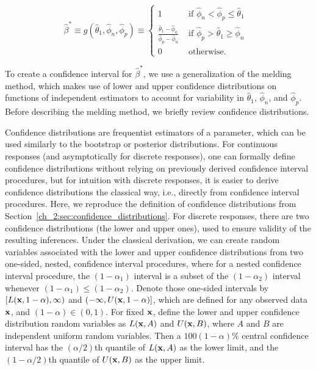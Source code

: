 \begin{equation}
\hat{\beta}^* \equiv
g(\hat{\theta}_1, \hat{\phi}_n, \hat{\phi}_p)
\equiv
\left\{
\begin{array}{ll}
1 & \mbox{ if $\hat{\phi}_n < \hat{\phi}_p \leq \hat{\theta}_1$ }  \\
\frac{\hat{\theta}_1 - \hat{\phi}_n}{\hat{\phi}_p - \hat{\phi}_n} &
\mbox{ if $\hat{\phi}_p > \hat{\theta}_1 \geq \hat{\phi}_n$ } \\
0 & \mbox{ otherwise.}
\end{array}
\right.
\label{ch_3:eq:srs-beta-est}
\end{equation}



To create a confidence interval for \( \hat{\beta}^* \), we use a generalization of the melding method, \cite{FayP:2015} which makes use of lower and upper confidence distributions on functions of independent estimators to account for variability in \( \hat{\theta}_1 \), \( \hat{\phi}_n \), and \( \hat{\phi}_p \).
Before describing the melding method, we briefly review confidence distributions.

Confidence distributions are frequentist estimators of a parameter, which can be used similarly to the bootstrap or posterior distributions.
For continuous responses (and asymptotically for discrete responses), one can formally define confidence distributions without relying on previously derived confidence interval procedures,\cite{Xie2013} but for intuition with discrete responses, it is easier to derive confidence distributions the classical way, i.e., directly from confidence interval procedures.
Here, we reproduce the definition of confidence distributions from Section~\ref{ch_2:sec:confidence_distributions}.
For discrete responses, there are two confidence distributions (the lower and upper ones), used to ensure validity of the resulting inferences.
Under the classical derivation, we can create random variables associated with the lower and upper confidence distributions from two one-sided, nested, confidence interval procedures, where for a nested confidence interval procedure, the $(1-\alpha_1)$ interval is a subset of the $(1-\alpha_2)$ interval whenever $(1-\alpha_1) \leq (1-\alpha_2)$.
Denote those one-sided intervals by $[L({\bf x},1-\alpha), \infty)$ and $(-\infty, U({\bf x},1-\alpha)]$, which are defined for any observed data ${\bf x}$, and $(1-\alpha) \in (0,1)$.
For fixed ${\bf x}$, define the lower and upper confidence distribution random variables as $L({\bf x}, A)$ and $U({\bf x},B)$, where $A$ and $B$ are independent uniform random variables.
Then a $100(1-\alpha)\%$ central confidence interval has the $(\alpha/2)$th quantile of $L({\bf x}, A)$ as the lower limit, and the $(1-\alpha/2)$th quantile of $U({\bf x},B)$ as the upper limit.


